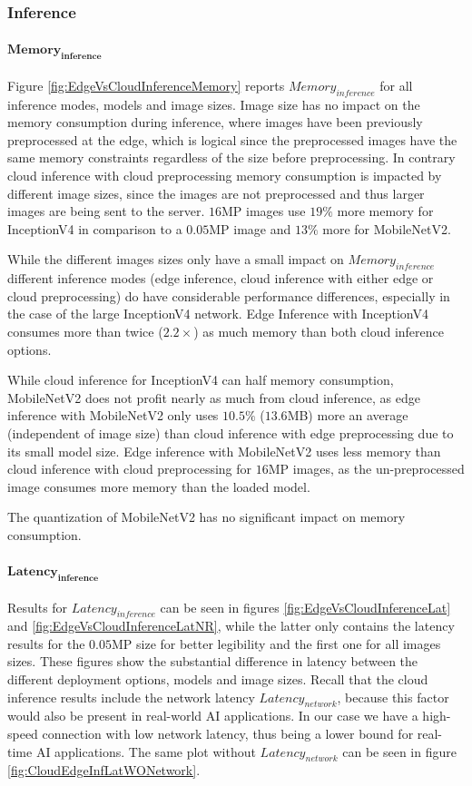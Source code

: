 \FloatBarrier
\subsubsection{Inference}
\paragraph{$\mathbf{Memory_{inference}}$}
Figure \ref{fig:EdgeVsCloudInferenceMemory} reports $Memory_{inference}$ for all inference modes, models and image sizes.
Image size has no impact on the memory consumption during inference, where images have been previously preprocessed at the edge, which is logical since the preprocessed images have the same memory constraints regardless of the size before preprocessing.
In contrary cloud inference with cloud preprocessing memory consumption is impacted by different image sizes, since the images are not preprocessed and thus larger images are being sent to the server.
$16$MP images use $19\%$ more memory for InceptionV4 in comparison to a $0.05$MP image and $13\%$ more for MobileNetV2.


While the different images sizes only have a small impact on $Memory_{inference}$ different inference modes (edge inference, cloud inference with either edge or cloud preprocessing) do have considerable performance differences, especially in the case of the large InceptionV4 network.
Edge Inference with InceptionV4 consumes more than twice ($2.2\times$) as much memory than both cloud inference options.

While cloud inference for InceptionV4 can half memory consumption, MobileNetV2 does not profit nearly as much from cloud inference, as edge inference with MobileNetV2 only uses $10.5\%$ ($13.6$MB) more an average (independent of image size) than cloud inference with edge preprocessing due to its small model size.
Edge inference with MobileNetV2 uses less memory than cloud inference with cloud preprocessing for $16$MP images, as the un-preprocessed image consumes more memory than the loaded model. 

The quantization of MobileNetV2 has no significant impact on memory consumption.


\paragraph{$\mathbf{Latency_{inference}}$}
Results for $Latency_{inference}$ can be seen in figures \ref{fig:EdgeVsCloudInferenceLat} and \ref{fig:EdgeVsCloudInferenceLatNR}, while the latter only contains the latency results for the $0.05$MP size for better legibility and the first one for all images sizes.
These figures show the substantial difference in latency between the different deployment options, models and image sizes.
Recall that the cloud inference results include the network latency $Latency_{network}$, because this factor would also be present in real-world AI applications.  In our case we have a high-speed connection with low network latency, thus being a lower bound for real-time AI applications. 
The same plot without $Latency_{network}$ can be seen in figure \ref{fig:CloudEdgeInfLatWONetwork}.

